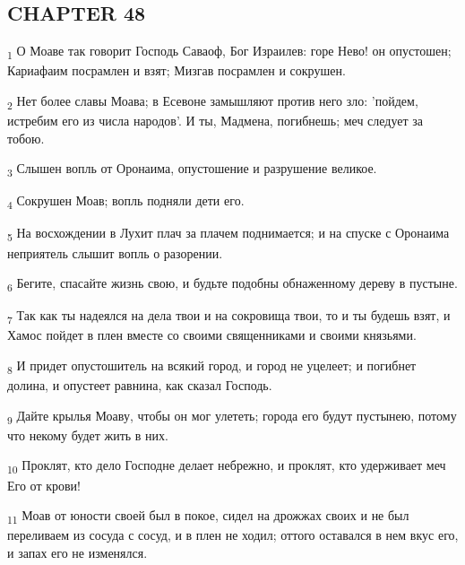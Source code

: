 \subsection{CHAPTER 48}
\begin{tcolorbox}
\textsubscript{1} О Моаве так говорит Господь Саваоф, Бог Израилев: горе Нево! он опустошен; Кариафаим посрамлен и взят; Мизгав посрамлен и сокрушен.
\end{tcolorbox}
\begin{tcolorbox}
\textsubscript{2} Нет более славы Моава; в Есевоне замышляют против него зло: 'пойдем, истребим его из числа народов'. И ты, Мадмена, погибнешь; меч следует за тобою.
\end{tcolorbox}
\begin{tcolorbox}
\textsubscript{3} Слышен вопль от Оронаима, опустошение и разрушение великое.
\end{tcolorbox}
\begin{tcolorbox}
\textsubscript{4} Сокрушен Моав; вопль подняли дети его.
\end{tcolorbox}
\begin{tcolorbox}
\textsubscript{5} На восхождении в Лухит плач за плачем поднимается; и на спуске с Оронаима неприятель слышит вопль о разорении.
\end{tcolorbox}
\begin{tcolorbox}
\textsubscript{6} Бегите, спасайте жизнь свою, и будьте подобны обнаженному дереву в пустыне.
\end{tcolorbox}
\begin{tcolorbox}
\textsubscript{7} Так как ты надеялся на дела твои и на сокровища твои, то и ты будешь взят, и Хамос пойдет в плен вместе со своими священниками и своими князьями.
\end{tcolorbox}
\begin{tcolorbox}
\textsubscript{8} И придет опустошитель на всякий город, и город не уцелеет; и погибнет долина, и опустеет равнина, как сказал Господь.
\end{tcolorbox}
\begin{tcolorbox}
\textsubscript{9} Дайте крылья Моаву, чтобы он мог улететь; города его будут пустынею, потому что некому будет жить в них.
\end{tcolorbox}
\begin{tcolorbox}
\textsubscript{10} Проклят, кто дело Господне делает небрежно, и проклят, кто удерживает меч Его от крови!
\end{tcolorbox}
\begin{tcolorbox}
\textsubscript{11} Моав от юности своей был в покое, сидел на дрожжах своих и не был переливаем из сосуда с сосуд, и в плен не ходил; оттого оставался в нем вкус его, и запах его не изменялся.
\end{tcolorbox}
